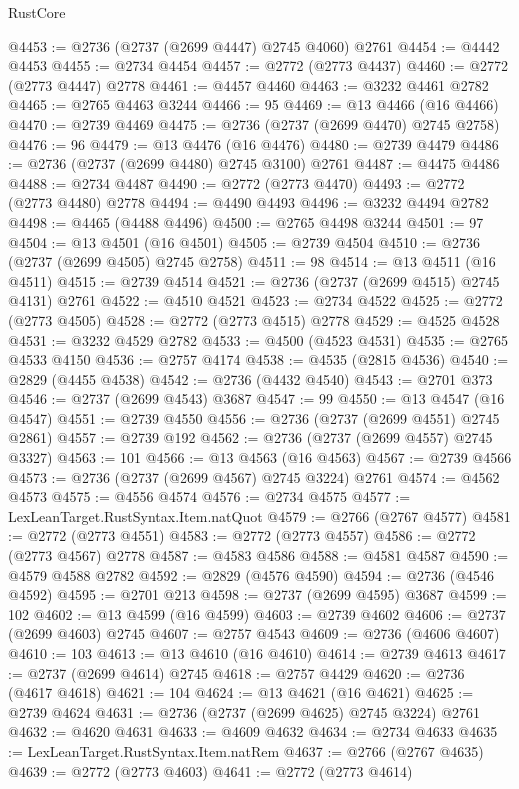 \begin{lexlean}{RustCore}
\begin{coremodule}
@4453 := @2736 (@2737 (@2699 @4447) @2745 @4060) @2761
@4454 := @4442 @4453
@4455 := @2734 @4454
@4457 := @2772 (@2773 @4437)
@4460 := @2772 (@2773 @4447) @2778
@4461 := @4457 @4460
@4463 := @3232 @4461 @2782
@4465 := @2765 @4463 @3244
@4466 := 95
@4469 := @13 @4466 (@16 @4466)
@4470 := @2739 @4469
@4475 := @2736 (@2737 (@2699 @4470) @2745 @2758)
@4476 := 96
@4479 := @13 @4476 (@16 @4476)
@4480 := @2739 @4479
@4486 := @2736 (@2737 (@2699 @4480) @2745 @3100) @2761
@4487 := @4475 @4486
@4488 := @2734 @4487
@4490 := @2772 (@2773 @4470)
@4493 := @2772 (@2773 @4480) @2778
@4494 := @4490 @4493
@4496 := @3232 @4494 @2782
@4498 := @4465 (@4488 @4496)
@4500 := @2765 @4498 @3244
@4501 := 97
@4504 := @13 @4501 (@16 @4501)
@4505 := @2739 @4504
@4510 := @2736 (@2737 (@2699 @4505) @2745 @2758)
@4511 := 98
@4514 := @13 @4511 (@16 @4511)
@4515 := @2739 @4514
@4521 := @2736 (@2737 (@2699 @4515) @2745 @4131) @2761
@4522 := @4510 @4521
@4523 := @2734 @4522
@4525 := @2772 (@2773 @4505)
@4528 := @2772 (@2773 @4515) @2778
@4529 := @4525 @4528
@4531 := @3232 @4529 @2782
@4533 := @4500 (@4523 @4531)
@4535 := @2765 @4533 @4150
@4536 := @2757 @4174
@4538 := @4535 (@2815 @4536)
@4540 := @2829 (@4455 @4538)
@4542 := @2736 (@4432 @4540)
@4543 := @2701 @373
@4546 := @2737 (@2699 @4543) @3687
@4547 := 99
@4550 := @13 @4547 (@16 @4547)
@4551 := @2739 @4550
@4556 := @2736 (@2737 (@2699 @4551) @2745 @2861)
@4557 := @2739 @192
@4562 := @2736 (@2737 (@2699 @4557) @2745 @3327)
@4563 := 101
@4566 := @13 @4563 (@16 @4563)
@4567 := @2739 @4566
@4573 := @2736 (@2737 (@2699 @4567) @2745 @3224) @2761
@4574 := @4562 @4573
@4575 := @4556 @4574
@4576 := @2734 @4575
@4577 := LexLeanTarget.RustSyntax.Item.natQuot
@4579 := @2766 (@2767 @4577)
@4581 := @2772 (@2773 @4551)
@4583 := @2772 (@2773 @4557)
@4586 := @2772 (@2773 @4567) @2778
@4587 := @4583 @4586
@4588 := @4581 @4587
@4590 := @4579 @4588 @2782
@4592 := @2829 (@4576 @4590)
@4594 := @2736 (@4546 @4592)
@4595 := @2701 @213
@4598 := @2737 (@2699 @4595) @3687
@4599 := 102
@4602 := @13 @4599 (@16 @4599)
@4603 := @2739 @4602
@4606 := @2737 (@2699 @4603) @2745
@4607 := @2757 @4543
@4609 := @2736 (@4606 @4607)
@4610 := 103
@4613 := @13 @4610 (@16 @4610)
@4614 := @2739 @4613
@4617 := @2737 (@2699 @4614) @2745
@4618 := @2757 @4429
@4620 := @2736 (@4617 @4618)
@4621 := 104
@4624 := @13 @4621 (@16 @4621)
@4625 := @2739 @4624
@4631 := @2736 (@2737 (@2699 @4625) @2745 @3224) @2761
@4632 := @4620 @4631
@4633 := @4609 @4632
@4634 := @2734 @4633
@4635 := LexLeanTarget.RustSyntax.Item.natRem
@4637 := @2766 (@2767 @4635)
@4639 := @2772 (@2773 @4603)
@4641 := @2772 (@2773 @4614)

\end{coremodule}
\end{lexlean}
